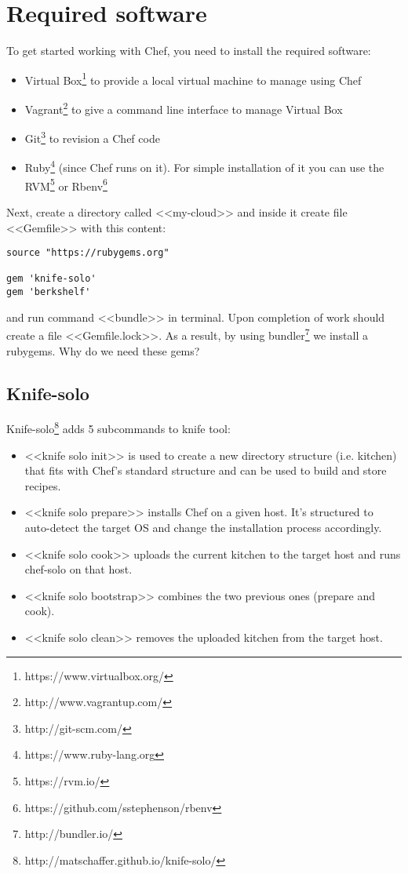 \section{Required software}

To get started working with Chef, you need to install the required software:

\begin{itemize}
  \item Virtual Box\footnote{https://www.virtualbox.org/} to provide a local virtual machine to manage using Chef
  \item Vagrant\footnote{http://www.vagrantup.com/} to give a command line interface to manage Virtual Box
  \item Git\footnote{http://git-scm.com/} to revision a Chef code
  \item Ruby\footnote{https://www.ruby-lang.org} (since Chef runs on it). For simple installation of it you can use the RVM\footnote{https://rvm.io/} or Rbenv\footnote{https://github.com/sstephenson/rbenv}
\end{itemize}

Next, create a directory called <<my-cloud>> and inside it create file <<Gemfile>> with this content:

\begin{lstlisting}[label=lst:my-cloud-required1,title=my-cloud/Gemfile]
source "https://rubygems.org"

gem 'knife-solo'
gem 'berkshelf'
\end{lstlisting}

and run command <<bundle>> in terminal. Upon completion of work should create a file <<Gemfile.lock>>. As a result, by using bundler\footnote{http://bundler.io/} we install a rubygems. Why do we need these gems?

\subsection{Knife-solo}

Knife-solo\footnote{http://matschaffer.github.io/knife-solo/} adds 5 subcommands to knife tool:

\begin{itemize}
  \item <<knife solo init>> is used to create a new directory structure (i.e. kitchen) that fits with Chef's standard structure and can be used to build and store recipes.
  \item <<knife solo prepare>> installs Chef on a given host. It's structured to auto-detect the target OS and change the installation process accordingly.
  \item <<knife solo cook>> uploads the current kitchen to the target host and runs chef-solo on that host.
  \item <<knife solo bootstrap>> combines the two previous ones (prepare and cook).
  \item <<knife solo clean>> removes the uploaded kitchen from the target host.
\end{itemize}

